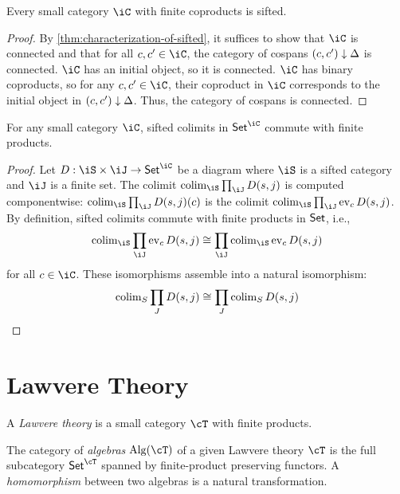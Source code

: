 \documentclass{zett}
\begin{document}
\begin{cor}\label{cor:finite-coproducts-then-sifted}
  Every small category $\iC$ with finite coproducts is sifted.
\end{cor}
\begin{proof}
  By \cref{thm:characterization-of-sifted}, it suffices to show that $\iC$ is connected and that for all $c, c' \in \iC$, the category of cospans $(c, c') \downarrow \Delta$ is connected.
  $\iC$ has an initial object, so it is connected.
  $\iC$ has binary coproducts, so for any $c, c' \in \iC$, their coproduct in $\iC$ corresponds to the initial object in $(c, c') \downarrow \Delta$.
  Thus, the category of cospans is connected.
\end{proof}

\begin{lem}\label{lem:functor-category-sifted-colimits-commute-with-finite-products}
  For any small category $\iC$, sifted colimits in $\CSet^{\iC}$ commute with finite products.
\end{lem}
\begin{proof}
  Let $D : \iS \times \iJ \to \CSet^{\iC}$ be a diagram where $\iS$ is a sifted category and $\iJ$ is a finite set.
  The colimit $\colim_{\iS}\prod_{\iJ}D(s,j)$ is computed componentwise: $\colim_{\iS}\prod_{\iJ}D(s,j)(c)$ is the colimit $\colim_{\iS}\prod_{\iJ}\ev_{c}D(s,j)$.
  By definition, sifted colimits commute with finite products in $\mathsf{Set}$, i.e.,
  \[
    \colim_{\iS}\prod_{\iJ}\ev_{c}D(s,j) \iso \prod_{\iJ}\colim_{\iS}\ev_{c}D(s,j)
  \]
  for all $c \in \iC$.
  These isomorphisms assemble into a natural isomorphism:
  \[
    \operatorname{colim}_{S}\prod_{J}D(s,j) \cong \prod_{J}\operatorname{colim}_{S}D(s,j)
  \]
\end{proof}

\section{Lawvere Theory}
\label{sec:lawvere-theory}

\begin{defn}
  A \emph{Lawvere theory} is a small category $\cT$ with finite products.
\end{defn}

\begin{defn}
  The category of \emph{algebras} $\Alg(\cT)$ of a given Lawvere theory $\cT$ is the full subcategory $\CSet^{\cT}$ spanned by finite-product preserving functors.
  A \emph{homomorphism} between two algebras is a natural transformation.
\end{defn}
\end{document}

